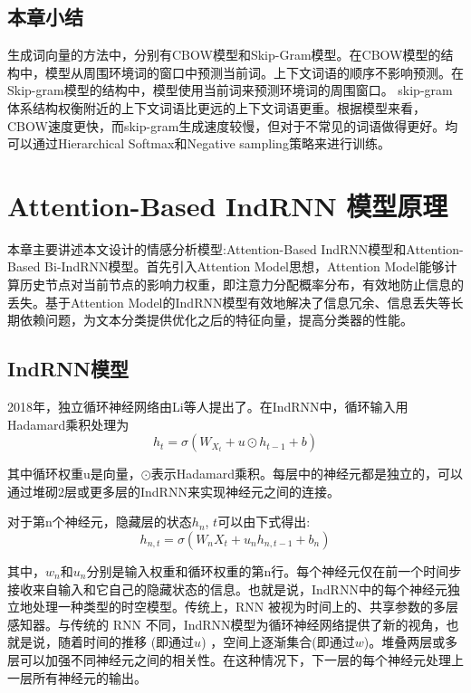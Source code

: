 \documentclass[a4paper,AutoFakeBold,oneside,12pt]{book}
\begin{document}
\section{本章小结}

生成词向量的方法中，分别有CBOW模型和Skip-Gram模型。在CBOW模型的结构中，模型从周围环境词的窗口中预测当前词。上下文词语的顺序不影响预测。在Skip-gram模型的结构中，模型使用当前词来预测环境词的周围窗口。 skip-gram体系结构权衡附近的上下文词语比更远的上下文词语更重。根据模型来看，CBOW速度更快，而skip-gram生成速度较慢，但对于不常见的词语做得更好。均可以通过Hierarchical Softmax和Negative sampling策略来进行训练。

\chapter{Attention-Based IndRNN 模型原理}
本章主要讲述本文设计的情感分析模型:Attention-Based IndRNN模型和Attention-Based Bi-IndRNN模型。首先引入Attention Model思想，Attention Model能够计算历史节点对当前节点的影响力权重，即注意力分配概率分布，有效地防止信息的丢失。基于Attention Model的IndRNN模型有效地解决了信息冗余、信息丢失等长期依赖问题，为文本分类提供优化之后的特征向量，提高分类器的性能。


\section{IndRNN模型}

2018年，独立循环神经网络由Li等人提出了\cite{liIndependentlyRecurrentNeural2018}。在IndRNN中，循环输入用Hadamard乘积处理为$$ h_t= \sigma (W_{X_t}+u \odot h_{t-1} + b) $$

其中循环权重u是向量，$ \odot $表示Hadamard乘积。每层中的神经元都是独立的，可以通过堆砌2层或更多层的IndRNN来实现神经元之间的连接。

对于第n个神经元，隐藏层的状态$h_n$, $t$可以由下式得出:
$$h_{n,t}=\sigma (W_nX_t+u_nh_{n,t-1}+b_n) $$

其中，$w_n$和$u_n$分别是输入权重和循环权重的第n行。每个神经元仅在前一个时间步接收来自输入和它自己的隐藏状态的信息。也就是说，IndRNN中的每个神经元独立地处理一种类型的时空模型。传统上，RNN 被视为时间上的、共享参数的多层感知器。与传统的 RNN 不同，IndRNN模型为循环神经网络提供了新的视角，也就是说，随着时间的推移 (即通过$u$) ，空间上逐渐集合(即通过$w$)。堆叠两层或多层可以加强不同神经元之间的相关性。在这种情况下，下一层的每个神经元处理上一层所有神经元的输出。
\end{document}
